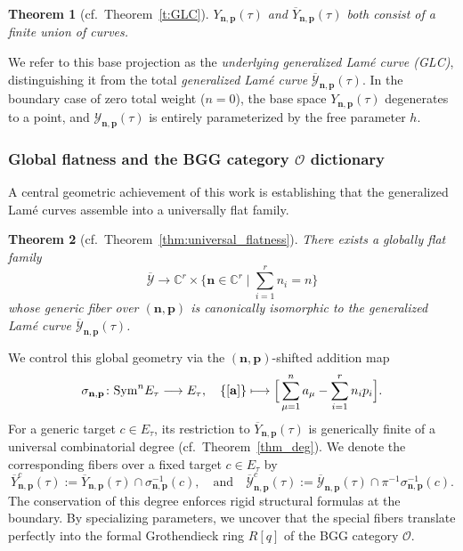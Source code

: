 \documentclass[11pt]{amsart}
\newtheorem{theorem}{Theorem}[section]
\theoremstyle{remark}
\numberwithin{equation}{section}
\newcommand{\Sym}{{\rm Sym}}
\begin{document}
\begin{theorem}[cf.~Theorem~\ref{t:GLC}]
$Y_{\mathbf{n}, \mathbf{p}}(\tau)$ and $\overline{Y}_{\mathbf{n}, \mathbf{p}}(\tau)$ both consist of a finite union of curves.
\end{theorem}

We refer to this base projection as the \emph{underlying generalized Lam\'e curve (GLC)}, distinguishing it from the total \emph{generalized Lam\'e curve} $\overline{\mathcal{Y}}_{\mathbf{n}, \mathbf{p}}(\tau)$. In the boundary case of zero total weight ($n=0$), the base space $Y_{\mathbf{n}, \mathbf{p}}(\tau)$ degenerates to a point, and $\mathcal{Y}_{\mathbf{n},\mathbf{p}}(\tau)$ is entirely parameterized by the free parameter $h$.

\subsubsection{Global flatness and the BGG category $\mathcal{O}$ dictionary} \label{ss:BGG}
A central geometric achievement of this work is establishing that the generalized Lam\'e curves assemble into a universally flat family.

\begin{theorem}[cf.~Theorem~\ref{thm:universal_flatness}]
There exists a globally flat family
\[
    \overline{\mathcal{Y}} \longrightarrow \mathbb{C}^r \times \Big\{ \mathbf{n} \in \mathbb{C}^r \;\Big|\; \sum_{i=1}^r n_i = n \Big\}
\]
whose generic fiber over $(\mathbf{n},\mathbf{p})$ is canonically isomorphic to the generalized Lam\'e curve $\overline{\mathcal{Y}}_{\mathbf{n}, \mathbf{p}}(\tau)$.
\end{theorem}

We control this global geometry via the $(\mathbf{n},\mathbf{p})$-shifted addition map
\[
\sigma_{\mathbf{n},\mathbf{p}} \colon \Sym^n E_\tau \longrightarrow E_\tau, \quad \{[\mathbf{a}]\} \longmapsto \Big[\sum_{\mu=1}^n a_\mu - \sum_{i=1}^r n_i p_i \Big].
\]
For a generic target $c \in E_\tau$, its restriction to $\overline{Y}_{\mathbf{n}, \mathbf{p}}(\tau)$ is generically finite of a universal combinatorial degree (cf.~Theorem~\ref{thm_deg}). We denote the corresponding fibers over a fixed target $c \in E_\tau$ by
\[
    \overline{Y}_{\mathbf{n},\mathbf{p}}^c(\tau) := \overline{Y}_{\mathbf{n},\mathbf{p}}(\tau) \cap \sigma^{-1}_{\mathbf{n},\mathbf{p}}(c), \quad \text{and} \quad \overline{\mathcal{Y}}_{\mathbf{n},\mathbf{p}}^c(\tau) := \overline{\mathcal{Y}}_{\mathbf{n},\mathbf{p}}(\tau) \cap \pi^{-1}\sigma^{-1}_{\mathbf{n},\mathbf{p}}(c).
\]
The conservation of this degree enforces rigid structural formulas at the boundary. By specializing parameters, we uncover that the special fibers translate perfectly into the formal Grothendieck ring $R[q]$ of the BGG category $\mathcal{O}$.
\end{document}
